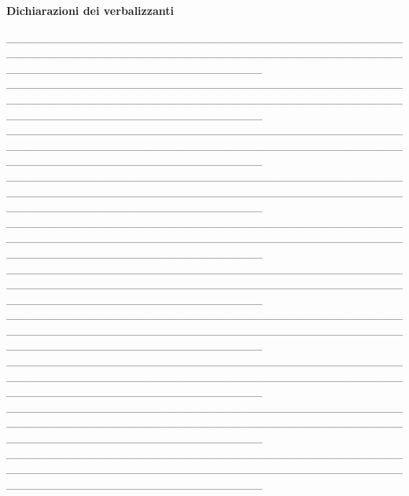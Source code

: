 \documentclass[12pt]{article}
\begin{document}
\begin{center}
    \textbf{Dichiarazioni dei verbalizzanti}
\end{center}

\_\_\_\_\_\_\_\_\_\_\_\_\_\_\_\_\_\_\_\_\_\_\_\_\_\_\_\_\_\_\_\_\_\_\_\_\_\_\_\_\_\_\_\_\_\_\_\_\_\_\_\_\_\_\_\_\_\_\_\_\_\_\_\_\_\_\_\_\_\_\_\_\_\_\_\_\_\_\_\_\_\_\_\_\_\_\_\_\_\_\_\_\_\_\_\_\_\_\_\_\_\_\_\_\_\_\_\_\_\_\_\_\_\_\_\_\_\_\_\_\_\_\_\_\_\_\_ \\
\_\_\_\_\_\_\_\_\_\_\_\_\_\_\_\_\_\_\_\_\_\_\_\_\_\_\_\_\_\_\_\_\_\_\_\_\_\_\_\_\_\_\_\_\_\_\_\_\_\_\_\_\_\_\_\_\_\_\_\_\_\_\_\_\_\_\_\_\_\_\_\_\_\_\_\_\_\_\_\_\_\_\_\_\_\_\_\_\_\_\_\_\_\_\_\_\_\_\_\_\_\_\_\_\_\_\_\_\_\_\_\_\_\_\_\_\_\_\_\_\_\_\_\_\_\_\_ \\\_\_\_\_\_\_\_\_\_\_\_\_\_\_\_\_\_\_\_\_\_\_\_\_\_\_\_\_\_\_\_\_\_\_\_\_\_\_\_\_\_\_\_\_\_\_\_\_\_\_\_\_\_\_\_\_\_\_\_\_\_\_\_\_\_\_\_\_\_\_\_\_\_\_\_\_\_\_\_\_\_\_\_\_\_\_\_\_\_\_\_\_\_\_\_\_\_\_\_\_\_\_\_\_\_\_\_\_\_\_\_\_\_\_\_\_\_\_\_\_\_\_\_\_\_\_\_ \\\_\_\_\_\_\_\_\_\_\_\_\_\_\_\_\_\_\_\_\_\_\_\_\_\_\_\_\_\_\_\_\_\_\_\_\_\_\_\_\_\_\_\_\_\_\_\_\_\_\_\_\_\_\_\_\_\_\_\_\_\_\_\_\_\_\_\_\_\_\_\_\_\_\_\_\_\_\_\_\_\_\_\_\_\_\_\_\_\_\_\_\_\_\_\_\_\_\_\_\_\_\_\_\_\_\_\_\_\_\_\_\_\_\_\_\_\_\_\_\_\_\_\_\_\_\_\_ \\\_\_\_\_\_\_\_\_\_\_\_\_\_\_\_\_\_\_\_\_\_\_\_\_\_\_\_\_\_\_\_\_\_\_\_\_\_\_\_\_\_\_\_\_\_\_\_\_\_\_\_\_\_\_\_\_\_\_\_\_\_\_\_\_\_\_\_\_\_\_\_\_\_\_\_\_\_\_\_\_\_\_\_\_\_\_\_\_\_\_\_\_\_\_\_\_\_\_\_\_\_\_\_\_\_\_\_\_\_\_\_\_\_\_\_\_\_\_\_\_\_\_\_\_\_\_\_ \\\_\_\_\_\_\_\_\_\_\_\_\_\_\_\_\_\_\_\_\_\_\_\_\_\_\_\_\_\_\_\_\_\_\_\_\_\_\_\_\_\_\_\_\_\_\_\_\_\_\_\_\_\_\_\_\_\_\_\_\_\_\_\_\_\_\_\_\_\_\_\_\_\_\_\_\_\_\_\_\_\_\_\_\_\_\_\_\_\_\_\_\_\_\_\_\_\_\_\_\_\_\_\_\_\_\_\_\_\_\_\_\_\_\_\_\_\_\_\_\_\_\_\_\_\_\_\_ \\\_\_\_\_\_\_\_\_\_\_\_\_\_\_\_\_\_\_\_\_\_\_\_\_\_\_\_\_\_\_\_\_\_\_\_\_\_\_\_\_\_\_\_\_\_\_\_\_\_\_\_\_\_\_\_\_\_\_\_\_\_\_\_\_\_\_\_\_\_\_\_\_\_\_\_\_\_\_\_\_\_\_\_\_\_\_\_\_\_\_\_\_\_\_\_\_\_\_\_\_\_\_\_\_\_\_\_\_\_\_\_\_\_\_\_\_\_\_\_\_\_\_\_\_\_\_\_ \\\_\_\_\_\_\_\_\_\_\_\_\_\_\_\_\_\_\_\_\_\_\_\_\_\_\_\_\_\_\_\_\_\_\_\_\_\_\_\_\_\_\_\_\_\_\_\_\_\_\_\_\_\_\_\_\_\_\_\_\_\_\_\_\_\_\_\_\_\_\_\_\_\_\_\_\_\_\_\_\_\_\_\_\_\_\_\_\_\_\_\_\_\_\_\_\_\_\_\_\_\_\_\_\_\_\_\_\_\_\_\_\_\_\_\_\_\_\_\_\_\_\_\_\_\_\_\_ \\\_\_\_\_\_\_\_\_\_\_\_\_\_\_\_\_\_\_\_\_\_\_\_\_\_\_\_\_\_\_\_\_\_\_\_\_\_\_\_\_\_\_\_\_\_\_\_\_\_\_\_\_\_\_\_\_\_\_\_\_\_\_\_\_\_\_\_\_\_\_\_\_\_\_\_\_\_\_\_\_\_\_\_\_\_\_\_\_\_\_\_\_\_\_\_\_\_\_\_\_\_\_\_\_\_\_\_\_\_\_\_\_\_\_\_\_\_\_\_\_\_\_\_\_\_\_\_ \\\_\_\_\_\_\_\_\_\_\_\_\_\_\_\_\_\_\_\_\_\_\_\_\_\_\_\_\_\_\_\_\_\_\_\_\_\_\_\_\_\_\_\_\_\_\_\_\_\_\_\_\_\_\_\_\_\_\_\_\_\_\_\_\_\_\_\_\_\_\_\_\_\_\_\_\_\_\_\_\_\_\_\_\_\_\_\_\_\_\_\_\_\_\_\_\_\_\_\_\_\_\_\_\_\_\_\_\_\_\_\_\_\_\_\_\_\_\_\_\_\_\_\_\_\_\_\_ 
\end{document}
